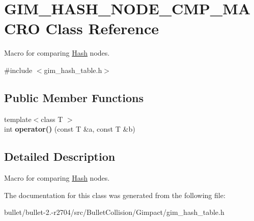 \hypertarget{class_g_i_m___h_a_s_h___n_o_d_e___c_m_p___m_a_c_r_o}{\section{G\+I\+M\+\_\+\+H\+A\+S\+H\+\_\+\+N\+O\+D\+E\+\_\+\+C\+M\+P\+\_\+\+M\+A\+C\+R\+O Class Reference}
\label{class_g_i_m___h_a_s_h___n_o_d_e___c_m_p___m_a_c_r_o}
}


Macro for comparing \hyperlink{struct_hash}{Hash} nodes.  




{\ttfamily \#include $<$gim\+\_\+hash\+\_\+table.\+h$>$}

\subsection*{Public Member Functions}
\begin{DoxyCompactItemize}
\item 
\hypertarget{class_g_i_m___h_a_s_h___n_o_d_e___c_m_p___m_a_c_r_o_ad25bf1672cd10f35957c0dcb72738f7c}{{\footnotesize template$<$class T $>$ }\\int {\bfseries operator()} (const T \&a, const T \&b)}\label{class_g_i_m___h_a_s_h___n_o_d_e___c_m_p___m_a_c_r_o_ad25bf1672cd10f35957c0dcb72738f7c}

\end{DoxyCompactItemize}


\subsection{Detailed Description}
Macro for comparing \hyperlink{struct_hash}{Hash} nodes. 

The documentation for this class was generated from the following file\+:\begin{DoxyCompactItemize}
\item 
bullet/bullet-\/2.-\/r2704/src/\+Bullet\+Collision/\+Gimpact/gim\+\_\+hash\+\_\+table.\+h\end{DoxyCompactItemize}
